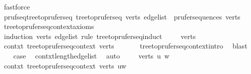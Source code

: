 \begin{isabellebody}
\ fastforce\isanewline
{}\isamarkupfalse%
%
\endisatagproof
{\isafoldproof}%
%
\isadelimproof
\isanewline
%
\endisadelimproof
\isanewline
{}\isamarkupfalse%
\ pruf{\isacharunderscore}{\kern0pt}seq{\isacharunderscore}{\kern0pt}tree{\isacharunderscore}{\kern0pt}to{\isacharunderscore}{\kern0pt}prufer{\isacharunderscore}{\kern0pt}seq{\isacharcolon}{\kern0pt}\ {\isachardoublequoteopen}tree{\isacharunderscore}{\kern0pt}to{\isacharunderscore}{\kern0pt}prufer{\isacharunderscore}{\kern0pt}seq\ verts\ edge{\isacharunderscore}{\kern0pt}list\ {\isasymin}\ prufer{\isacharunderscore}{\kern0pt}sequences\ verts{\isachardoublequoteclose}\isanewline
%
\isadelimproof
\ \ %
\endisadelimproof
%
\isatagproof
{}\isamarkupfalse%
\ tree{\isacharunderscore}{\kern0pt}to{\isacharunderscore}{\kern0pt}prufer{\isacharunderscore}{\kern0pt}seq{\isacharunderscore}{\kern0pt}context{\isacharunderscore}{\kern0pt}axioms\isanewline
{}\isamarkupfalse%
\ {\isacharparenleft}{\kern0pt}induction\ verts\ edge{\isacharunderscore}{\kern0pt}list\ rule{\isacharcolon}{\kern0pt}\ tree{\isacharunderscore}{\kern0pt}to{\isacharunderscore}{\kern0pt}prufer{\isacharunderscore}{\kern0pt}seq{\isachardot}{\kern0pt}induct{\isacharparenright}{\kern0pt}\isanewline
\ \ \isamarkupfalse%
\ {\isacharparenleft}{\kern0pt}{}\ verts{\isacharparenright}{\kern0pt}\isanewline
\ \ \isamarkupfalse%
\ \isamarkupfalse%
\ contxt{\isacharcolon}{\kern0pt}\ tree{\isacharunderscore}{\kern0pt}to{\isacharunderscore}{\kern0pt}prufer{\isacharunderscore}{\kern0pt}seq{\isacharunderscore}{\kern0pt}context\ verts\ {\isachardoublequoteopen}{\isacharbrackleft}{\kern0pt}{\isacharbrackright}{\kern0pt}{\isachardoublequoteclose}\isanewline
\ \ \ \ \isamarkupfalse%
\ tree{\isacharunderscore}{\kern0pt}to{\isacharunderscore}{\kern0pt}prufer{\isacharunderscore}{\kern0pt}seq{\isacharunderscore}{\kern0pt}context{\isachardot}{\kern0pt}intro\ \isamarkupfalse%
\ blast\isanewline
\ \ \isamarkupfalse%
\ {\isacharquery}{\kern0pt}case\ \isamarkupfalse%
\ contxt{\isachardot}{\kern0pt}length{\isacharunderscore}{\kern0pt}edge{\isacharunderscore}{\kern0pt}list\ \isamarkupfalse%
\ auto\isanewline
{}\isamarkupfalse%
\isanewline
\ \ \isamarkupfalse%
\ {\isacharparenleft}{\kern0pt}{}\ verts\ u\ w{\isacharparenright}{\kern0pt}\isanewline
\ \ \isamarkupfalse%
\ \isamarkupfalse%
\ contxt{\isacharcolon}{\kern0pt}\ tree{\isacharunderscore}{\kern0pt}to{\isacharunderscore}{\kern0pt}prufer{\isacharunderscore}{\kern0pt}seq{\isacharunderscore}{\kern0pt}context\ verts\ {\isachardoublequoteopen}{\isacharbrackleft}{\kern0pt}{\isacharparenleft}{\kern0pt}u{\isacharcomma}{\kern0pt}w{\isacharparenright}{\kern0pt}{\isacharbrackright}{\kern0pt}{\isachardoublequoteclose}\isanewline

\end{isabellebody}
